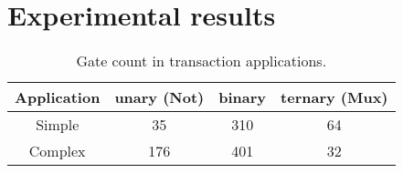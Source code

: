 \documentclass[a4paper]{article}
\begin{document}
\section{Experimental results}

\begin{table}[]
    \centering
    \begin{tabular}{c|c|c|c}
        Application & unary (Not) & binary & ternary (Mux) \\
        \hline
        Simple & 35 & 310 & 64 \\
        Complex & 176 & 401 & 32 
    \end{tabular}
    \caption{Gate count in transaction applications.}
    \label{tab:gate_count}
\end{table}









\end{document}
